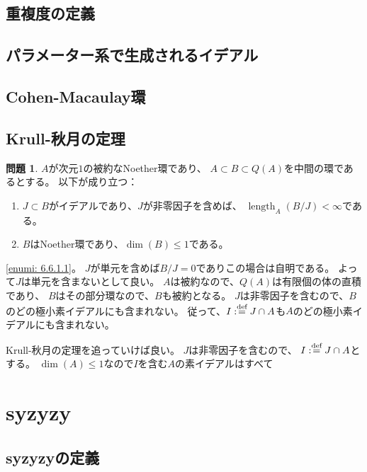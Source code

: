 \documentclass[uplatex]{jsarticle}
\makeatletter
\theoremstyle{definition}
\newtheorem{prob}[prob]{問題}
\renewenvironment{proof}[1][\proofname]{
  \pushQED{\qed}%
  \normalfont \topsep6\p@\@plus6\p@\relax
  \trivlist
  \item[\hskip\labelsep
    #1\@addpunct{\textbf{.}}]\ignorespaces
}{%
  \popQED\endtrivlist\@endpefalse
}
\providecommand{\proofname}{証明}
\DeclareMathOperator{\length}{\mathrm{length}}
\def\dfn{:\overset{\mbox{{\scriptsize def}}}{=}}
\makeatother
\begin{document}
\subsection{重複度の定義}
\subsection{パラメーター系で生成されるイデアル}
\subsection{Cohen-Macaulay環}
\subsection{Krull-秋月の定理}

\begin{prob}
  \label{prob: 6.6.1}
  \(A\)が次元\(1\)の被約なNoether環であり、
  \(A\subset B\subset Q(A)\)を中間の環であるとする。
  以下が成り立つ：
  \begin{enumerate}
    \item \label{enumi: 6.6.1.1}
    \(J\subset B\)がイデアルであり、\(J\)が非零因子を含めば、
    \(\length_A(B/J)<\infty\)である。
    \item \label{enumi: 6.6.1.2}
    \(B\)はNoether環であり、\(\dim(B)\leq 1\)である。
  \end{enumerate}
\end{prob}

\begin{proof}
  \ref{enumi: 6.6.1.1}。
  \(J\)が単元を含めば\(B/J=0\)でありこの場合は自明である。
  よって\(J\)は単元を含まないとして良い。
  \(A\)は被約なので、\(Q(A)\)は有限個の体の直積であり、
  \(B\)はその部分環なので、\(B\)も被約となる。
  \(J\)は非零因子を含むので、\(B\)のどの極小素イデアルにも含まれない。
  従って、\(I\dfn J\cap A\)も\(A\)のどの極小素イデアルにも含まれない。

  Krull-秋月の定理を追っていけば良い。
  \(J\)は非零因子を含むので、
  \(I\dfn J\cap A\)とする。
  \(\dim(A)\leq 1\)なので\(I\)を含む\(A\)の素イデアルはすべて
\end{proof}



\section{syzyzy}
\subsection{syzyzyの定義}
\end{document}
